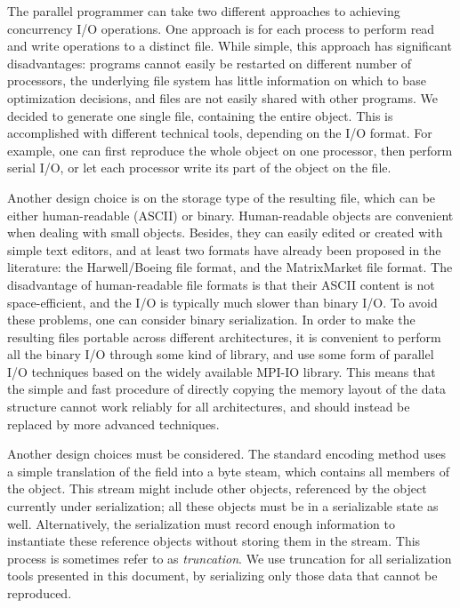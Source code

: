 \documentclass[11pt,relax]{SANDreport}
\begin{document}
The parallel programmer can take two different approaches to achieving
concurrency I/O operations. One approach is for each process to perform read
and write operations to a distinct file. While simple, this approach has
significant disadvantages: programs cannot easily be restarted on different
number of processors, the underlying file system has little information on
which to base optimization decisions, and files are not easily shared with
other programs. We decided to generate one single file, containing the entire
object. This is accomplished with different technical tools, depending on the
I/O format. For example, one can first reproduce the whole object on one
processor, then perform serial I/O, or let each processor write its part of
the object on the file.

Another design choice is  on the storage type of the resulting file, which
can be either human-readable (ASCII) or binary.
Human-readable objects are convenient when dealing with small objects.
Besides, they can easily edited or created with simple text editors, and at
least two formats have already been proposed in the literature: the
Harwell/Boeing file format, and the MatrixMarket file format. The
disadvantage of human-readable file formats is that their ASCII content is not
space-efficient, and the I/O is typically much slower than binary I/O. To
avoid these problems,
one can consider binary serialization. In order to make the resulting files
portable across different architectures, it is convenient to perform all the
binary I/O through some kind of library, and use some form of parallel I/O
techniques based on the widely available MPI-IO library.  This means that the
simple and fast procedure of directly copying the memory layout of the data
structure cannot work reliably for all architectures, and should instead be
replaced by more advanced techniques.

Another design choices must be considered.
The standard encoding method uses a simple translation of the field into a
byte steam, which contains all members of the object. This stream might
include other objects, referenced by the object currently under serialization;
all these objects must be in a serializable state as well. Alternatively, the
serialization must record enough information to instantiate these reference
objects without storing them in the stream. This process is sometimes refer to
as {\sl truncation}. We use truncation for all serialization tools presented
in this document, by serializing only those data that cannot be reproduced.
\end{document}
